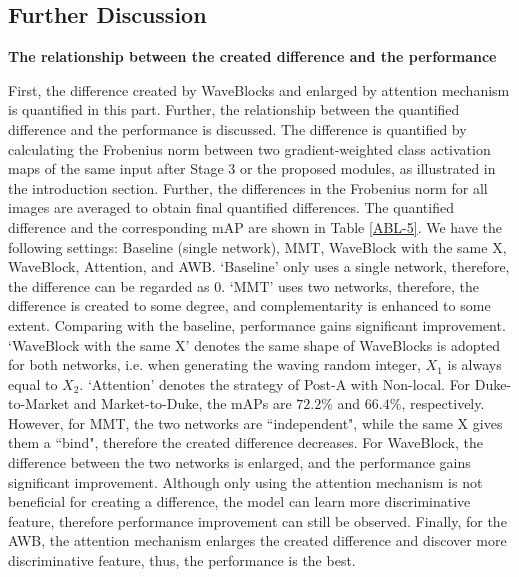 \documentclass[journal]{IEEEtran}
\begin{document}
\subsection{Further Discussion}
\textbf{The relationship between the created difference and the performance}\par 
First, the difference created by WaveBlocks and enlarged by attention mechanism is quantified in this part.  Further, the relationship between the quantified difference and the performance is discussed. The difference is quantified by calculating the Frobenius norm between two gradient-weighted class activation maps \cite{selvaraju2017grad} of the same input after Stage $3$ or the proposed modules, as illustrated in the introduction section. Further, the differences in the Frobenius norm for all images are averaged to obtain final quantified differences.  The quantified difference and the corresponding mAP are shown in Table  \ref{ABL-5}.  
We have the following settings: Baseline (single network), MMT, WaveBlock with the same X, WaveBlock, Attention, and AWB.  `Baseline' only uses a single network, therefore, the difference can be regarded as $0$.  `MMT' uses two networks, therefore, the difference is created to some degree, and complementarity is enhanced to some extent. Comparing with the baseline, performance gains significant improvement.  `WaveBlock with the same X' denotes the same shape of WaveBlocks is adopted for both networks, i.e. when generating the waving random integer, $X_1$ is always equal to $X_2$.  `Attention' denotes the strategy of Post-A with Non-local. For Duke-to-Market and Market-to-Duke, the mAPs are $72.2\%$ and $66.4\%$, respectively. However, for MMT, the two networks are ``independent", while the same X gives them a ``bind", therefore the created difference decreases. For WaveBlock, the difference between the two networks is enlarged,  and the performance gains significant improvement. Although only using the attention mechanism is not beneficial for creating a difference, the model can learn more discriminative feature, therefore performance improvement can still be observed.  Finally, for the AWB, the attention mechanism enlarges the created difference and discover more discriminative feature, thus, the performance is the best.
\end{document}
